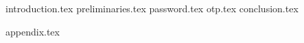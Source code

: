 {introduction.tex}
{preliminaries.tex}
{password.tex}
{otp.tex}
{conclusion.tex}

\appendix
{appendix.tex}
